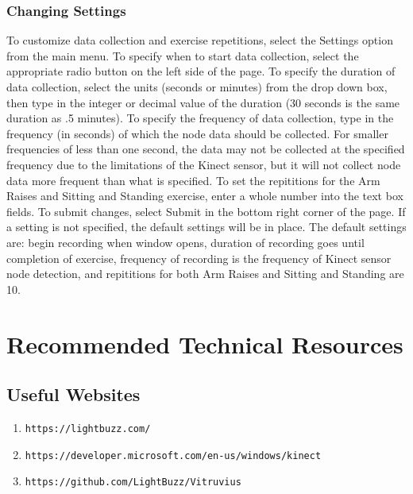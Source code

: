 \documentclass[onecolumn, draftclsnofoot,10pt, compsoc]{IEEEtran}
\begin{document}
\subsubsection{Changing Settings}
To customize data collection and exercise repetitions, select the Settings option from the main menu. To specify when to start data collection, select the appropriate radio button on the left side of the page. To specify the duration of data collection, select the units (seconds or minutes) from the drop down box, then type in the integer or decimal value of the duration (30 seconds is the same duration as .5 minutes). To specify the frequency of data collection, type in the frequency (in seconds) of which the node data should be collected. For smaller frequencies of less than one second, the data may not be collected at the specified frequency due to the limitations of the Kinect sensor, but it will not collect node data more frequent than what is specified. To set the repititions for the Arm Raises and Sitting and Standing exercise, enter a whole number into the text box fields. To submit changes, select Submit in the bottom right corner of the page. If a setting is not specified, the default settings will be in place. The default settings are: begin recording when window opens, duration of recording goes until completion of exercise, frequency of recording is the frequency of Kinect sensor node detection, and repititions for both Arm Raises and Sitting and Standing are 10.
\section{Recommended Technical Resources}
\subsection{Useful Websites}
\begin{enumerate}
\item \verb+https://lightbuzz.com/+
\item \verb+https://developer.microsoft.com/en-us/windows/kinect+
\item \verb+https://github.com/LightBuzz/Vitruvius+
\end{enumerate}
\end{document}
